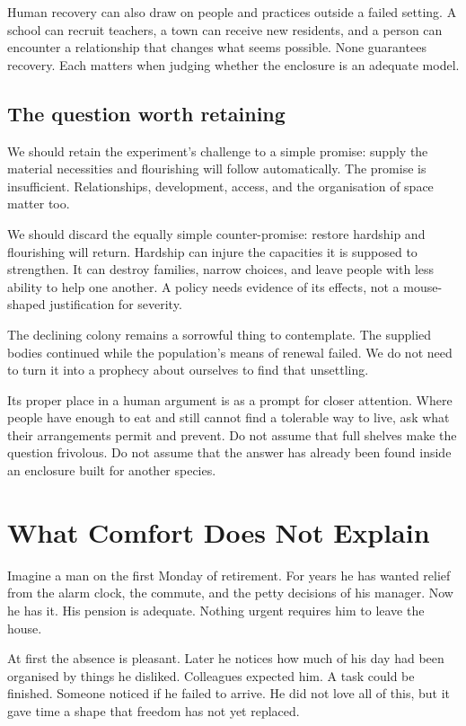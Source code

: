 \documentclass[12pt,a4paper]{book}
\begin{document}
Human recovery can also draw on people and practices outside a failed setting. A school can recruit teachers, a town can receive new residents, and a person can encounter a relationship that changes what seems possible. None guarantees recovery. Each matters when judging whether the enclosure is an adequate model.

\section*{The question worth retaining}

We should retain the experiment's challenge to a simple promise: supply the material necessities and flourishing will follow automatically. The promise is insufficient. Relationships, development, access, and the organisation of space matter too.

We should discard the equally simple counter-promise: restore hardship and flourishing will return. Hardship can injure the capacities it is supposed to strengthen. It can destroy families, narrow choices, and leave people with less ability to help one another. A policy needs evidence of its effects, not a mouse-shaped justification for severity.

The declining colony remains a sorrowful thing to contemplate. The supplied bodies continued while the population's means of renewal failed. We do not need to turn it into a prophecy about ourselves to find that unsettling.

Its proper place in a human argument is as a prompt for closer attention. Where people have enough to eat and still cannot find a tolerable way to live, ask what their arrangements permit and prevent. Do not assume that full shelves make the question frivolous. Do not assume that the answer has already been found inside an enclosure built for another species.

\chapter{What Comfort Does Not Explain}

Imagine a man on the first Monday of retirement. For years he has wanted relief from the alarm clock, the commute, and the petty decisions of his manager. Now he has it. His pension is adequate. Nothing urgent requires him to leave the house.

At first the absence is pleasant. Later he notices how much of his day had been organised by things he disliked. Colleagues expected him. A task could be finished. Someone noticed if he failed to arrive. He did not love all of this, but it gave time a shape that freedom has not yet replaced.
\end{document}
